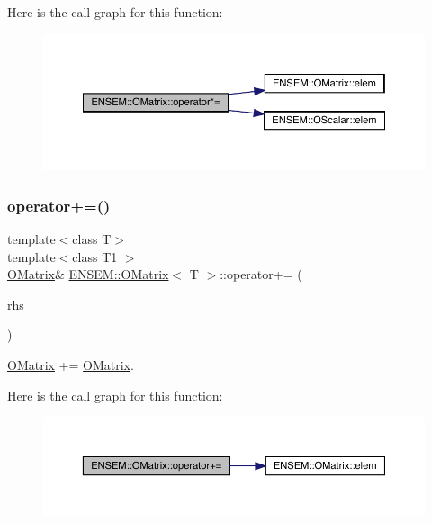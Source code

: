 Here is the call graph for this function\+:
\nopagebreak
\begin{figure}[H]
\begin{center}
\leavevmode
\includegraphics[width=350pt]{dd/d80/classENSEM_1_1OMatrix_a40e18b83c9eb609f7529e65c515010c2_cgraph}
\end{center}
\end{figure}
\mbox{\label{classENSEM_1_1OMatrix_a221eb5f9e17402ad93c829fcaf2ac60a}} 
\subsubsection{\texorpdfstring{operator+=()}{operator+=()}\hspace{0.1cm}{\footnotesize\ttfamily [1/6]}}
{\footnotesize\ttfamily template$<$class T$>$ \\
template$<$class T1 $>$ \\
\mbox{\hyperlink{classENSEM_1_1OMatrix}{O\+Matrix}}\& \mbox{\hyperlink{classENSEM_1_1OMatrix}{E\+N\+S\+E\+M\+::\+O\+Matrix}}$<$ T $>$\+::operator+= (\begin{DoxyParamCaption}\item[{const \mbox{\hyperlink{classENSEM_1_1OMatrix}{O\+Matrix}}$<$ T1 $>$ \&}]{rhs }\end{DoxyParamCaption})\hspace{0.3cm}{\ttfamily [inline]}}



\mbox{\hyperlink{classENSEM_1_1OMatrix}{O\+Matrix}} += \mbox{\hyperlink{classENSEM_1_1OMatrix}{O\+Matrix}}. 

Here is the call graph for this function\+:
\nopagebreak
\begin{figure}[H]
\begin{center}
\leavevmode
\includegraphics[width=350pt]{dd/d80/classENSEM_1_1OMatrix_a221eb5f9e17402ad93c829fcaf2ac60a_cgraph}
\end{center}
\end{figure}
\mbox{\label{classENSEM_1_1OMatrix_a221eb5f9e17402ad93c829fcaf2ac60a}} 
